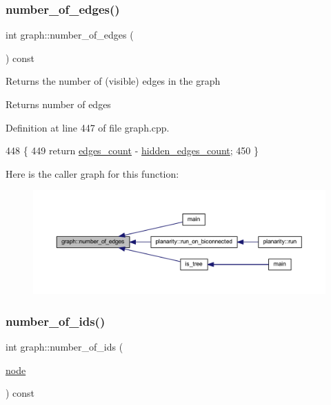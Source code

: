 \subsubsection{\texorpdfstring{number\+\_\+of\+\_\+edges()}{number\_of\_edges()}}
{\footnotesize\ttfamily int graph\+::number\+\_\+of\+\_\+edges (\begin{DoxyParamCaption}{ }\end{DoxyParamCaption}) const\hspace{0.3cm}{\ttfamily [inherited]}}

Returns the number of (visible) edges in the graph

\begin{DoxyReturn}{Returns}
number of edges 
\end{DoxyReturn}


Definition at line 447 of file graph.\+cpp.


\begin{DoxyCode}
448 \{
449     \textcolor{keywordflow}{return} \mbox{\hyperlink{classgraph_af560ff4263ad165c166a46084e781b4a}{edges\_count}} - \mbox{\hyperlink{classgraph_a3151f544e049fbd985204ca9d8f74c97}{hidden\_edges\_count}};
450 \}
\end{DoxyCode}
Here is the caller graph for this function\+:
\nopagebreak
\begin{figure}[H]
\begin{center}
\leavevmode
\includegraphics[width=350pt]{classgraph_aa4fcbe7bf572dc800068873ccfb4d95a_icgraph}
\end{center}
\end{figure}
\mbox{\label{classgraph_a82f09714f50dbe41e1a9cbcb12ad0866}} 
\subsubsection{\texorpdfstring{number\+\_\+of\+\_\+ids()}{number\_of\_ids()}\hspace{0.1cm}{\footnotesize\ttfamily [1/2]}}
{\footnotesize\ttfamily int graph\+::number\+\_\+of\+\_\+ids (\begin{DoxyParamCaption}\item[{\mbox{\hyperlink{classnode}{node}}}]{ }\end{DoxyParamCaption}) const\hspace{0.3cm}{\ttfamily [inherited]}}



